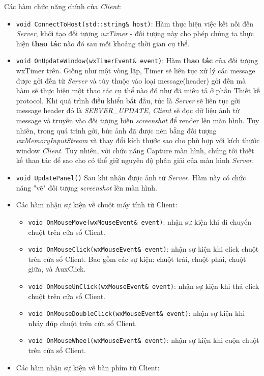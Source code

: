 Các hàm chức năng chính của \textit{Client}: 
\begin{itemize}
	\item \lstinline{void ConnectToHost(std::string& host)}: Hàm thực hiện việc kết nối đến \textit{Server}, khởi tạo đối tượng \textit{wxTimer} - đối tượng này cho phép chúng ta thực hiện \textbf{thao tác} nào đó sau mỗi khoảng thời gian cụ thể. 
	\item \lstinline{void OnUpdateWindow(wxTimerEvent& event)}: Hàm \textbf{thao tác} của đối tượng wxTimer trên. Giống như một vòng lặp, Timer sẽ liên tục xử lý các message được gởi đến từ \textit{Server} và tùy thuộc vào loại message(header) gởi đến mà hàm sẽ thực hiện một thao tác cụ thể nào đó như đã miêu tả ở phần Thiết kế protocol. Khi quá trình điều khiển bắt đầu, tức là \textit{Server} sẽ liên tục gởi message header đó là \textit{SERVER\_UPDATE}, \textit{Client} sẽ đọc dữ liệu ảnh từ message và truyền vào đối tượng biến \textit{screenshot} để render lên màn hình. Tuy nhiên, trong quá trình gởi, bức ảnh đã được nén bằng đối tượng \textit{wxMemoryInputStream} và thay đổi kích thước sao cho phù hợp với kích thước window \textit{Client}. Tuy nhiên, với chức năng Capture màn hình, chúng tôi thiết kế thao tác để sao cho có thể giữ nguyên độ phân giải của màn hình \textit{Server}.
	\item \lstinline{void UpdatePanel()} Sau khi nhận được ảnh từ \textit{Server}. Hàm này có chức năng "vẽ" đối tượng \textit{screenshot} lên màn hình. 
	\item Các hàm nhận sự kiện về chuột máy tính từ Client:
		\begin{itemize}
			\item[] \lstinline{void OnMouseMove(wxMouseEvent& event)}: nhận sự kiện khi di chuyển chuột trên cửa sổ Client.
			\item[] \lstinline{void OnMouseClick(wxMouseEvent& event)}: nhận sự kiện khi click chuột trên cửa sổ Client. Bao gồm các sự kiện: chuột trái, chuột phải, chuột giữa, và AuxClick.
			\item[] \lstinline{void OnMouseUnClick(wxMouseEvent& event)}: nhận sự kiện khi thả click chuột trên cửa sổ Client.
			\item[] \lstinline{void OnMouseDoubleClick(wxMouseEvent& event)}: nhận sự kiện khi nháy đúp chuột trên cửa sổ Client.
			\item[] \lstinline{void OnMouseWheel(wxMouseEvent& event)}: nhận sự kiện khi cuộn chuột trên cửa sổ Client.
		\end{itemize}
	\item Các hàm nhận sự kiện về bàn phím từ Client:

\end{itemize}
